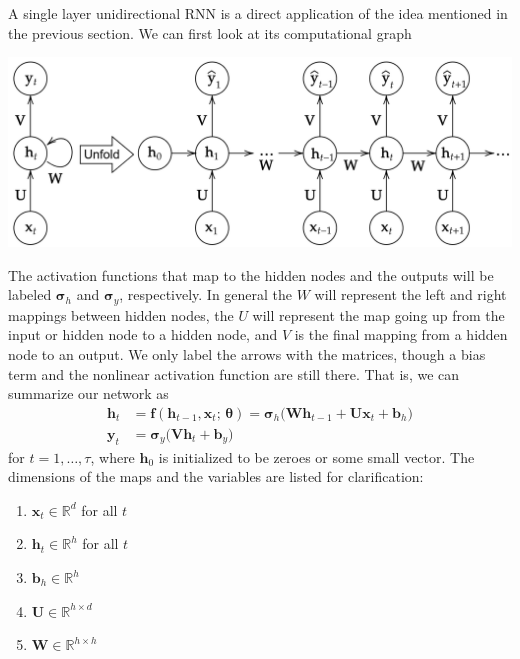 \documentclass{article}
\begin{document}
    A single layer unidirectional RNN is a direct application of the idea mentioned in the previous section. We can first look at its computational graph 
    \begin{center}
        \includegraphics[scale=0.3]{img/04_RNN/One_Layer_RNN.png}
    \end{center}
    The activation functions that map to the hidden nodes and the outputs will be labeled $\boldsymbol{\sigma}_{h}$ and $\boldsymbol{\sigma}_{y}$, respectively. In general the $W$ will represent the left and right mappings between hidden nodes, the $U$ will represent the map going up from the input or hidden node to a hidden node, and $V$ is the final mapping from a hidden node to an output. We only label the arrows with the matrices, though a bias term and the nonlinear activation function are still there. That is, we can summarize our network as
    \begin{align*}
        \mathbf{h}_t & = \mathbf{f}( \mathbf{h}_{t - 1}, \mathbf{x}_{t} ; \, \boldsymbol{\theta}) = \boldsymbol{\sigma}_h \big( \mathbf{W} \mathbf{h}_{t - 1} + \mathbf{U} \mathbf{x}_t + \mathbf{b}_h \big) \\
        \mathbf{y}_t & = \boldsymbol{\sigma}_y \big( \mathbf{V} \mathbf{h}_t + \mathbf{b}_y \big) 
    \end{align*}
    for $t = 1, \ldots, \tau$, where $\mathbf{h}_0$ is initialized to be zeroes or some small vector. The dimensions of the maps and the variables are listed for clarification: 
    \begin{enumerate}
        \item $\mathbf{x}_t \in \mathbb{R}^d$ for all $t$
        \item $\mathbf{h}_t \in \mathbb{R}^h$ for all $t$
        \item $\mathbf{b}_h \in \mathbb{R}^h$
        \item $\mathbf{U} \in \mathbb{R}^{h \times d}$
        \item $\mathbf{W} \in \mathbb{R}^{h \times h}$
    \end{enumerate}
\end{document}
